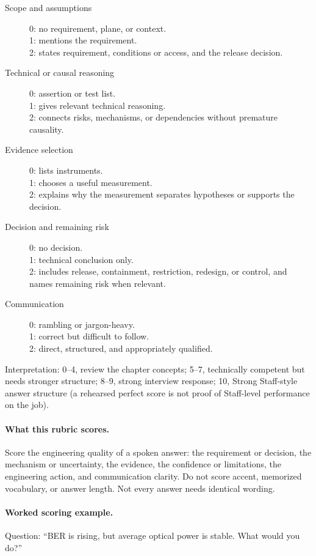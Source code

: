 \begin{description}
\item[Scope and assumptions]
      0: no requirement, plane, or context.\\
      1: mentions the requirement.\\
      2: states requirement, conditions or access, and the release decision.
\item[Technical or causal reasoning]
      0: assertion or test list.\\
      1: gives relevant technical reasoning.\\
      2: connects risks, mechanisms, or dependencies without premature
      causality.
\item[Evidence selection]
      0: lists instruments.\\
      1: chooses a useful measurement.\\
      2: explains why the measurement separates hypotheses or supports the
      decision.
\item[Decision and remaining risk]
      0: no decision.\\
      1: technical conclusion only.\\
      2: includes release, containment, restriction, redesign, or control, and
      names remaining risk when relevant.
\item[Communication]
      0: rambling or jargon-heavy.\\
      1: correct but difficult to follow.\\
      2: direct, structured, and appropriately qualified.
\end{description}

Interpretation: 0--4, review the chapter concepts; 5--7, technically competent
but needs stronger structure; 8--9, strong interview response; 10, Strong
Staff-style answer structure (a rehearsed perfect score is not proof of
Staff-level performance on the job).

\paragraph{What this rubric scores.}
Score the engineering quality of a spoken answer: the requirement or decision,
the mechanism or uncertainty, the evidence, the confidence or limitations, the
engineering action, and communication clarity. Do not score accent, memorized
vocabulary, or answer length. Not every answer needs identical wording.

\paragraph{Worked scoring example.}
\label{sec:chapter-rubric-example}
Question: ``BER is rising, but average optical power is stable. What would you
do?''

